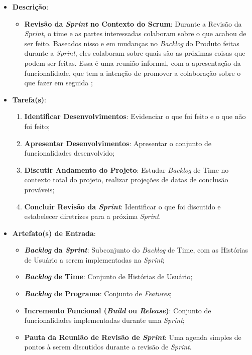 				\begin{itemize}
					\item{\textbf{Descrição}:
						\begin{itemize}
							\item{\textbf{Revisão da \emph{Sprint} no Contexto do Scrum}: Durante a Revisão da \emph{Sprint}, o time e as partes interessadas colaboram sobre o que acabou de ser feito. Baseados nisso e em mudanças no \emph{Backlog} do Produto feitas durante a \emph{Sprint}, eles colaboram sobre quais são as próximas coisas que podem ser feitas. Essa é uma reunião informal, com a apresentação da funcionalidade, que tem a intenção de promover a colaboração sobre o que fazer em seguida \cite{guiadoscrum};}
						\end{itemize}}
					\item{\textbf{Tarefa(s)}:
						\begin{enumerate}
							\item{\textbf{Identificar Desenvolvimentos}: Evidenciar o que foi feito e o que não foi feito;}
							\item{\textbf{Apresentar Desenvolvimentos}: Apresentar o conjunto de funcionalidades desenvolvido;}
							\item{\textbf{Discutir Andamento do Projeto}: Estudar \emph{Backlog} de Time no contexto total do projeto, realizar projeções de datas de conclusão prováveis;}
							\item{\textbf{Concluir Revisão da \emph{Sprint}}: Identificar o que foi discutido e estabelecer diretrizes para a próxima \emph{Sprint}.}
						\end{enumerate}}
					\item{\textbf{Artefato(s) de Entrada}:
						\begin{itemize}
							\item{\textbf{\emph{Backlog} da \emph{Sprint}}: Subconjunto do \emph{Backlog} de Time, com as Histórias de Usuário a serem implementadas na \emph{Sprint};}
							\item{\textbf{\emph{Backlog} de Time}: Conjunto de Histórias de Usuário;}
							\item{\textbf{\emph{Backlog} de Programa}: Conjunto de \emph{Features};}
							\item{\textbf{Incremento Funcional (\emph{Build} ou \emph{Release})}: Conjunto de funcionalidades implementadas durante uma \emph{Sprint};}
							\item{\textbf{Pauta da Reunião de Revisão de \emph{Sprint}}: Uma agenda simples de pontos à serem discutidos durante a revisão de \emph{Sprint}.}

\end{itemize}}
\end{itemize}
